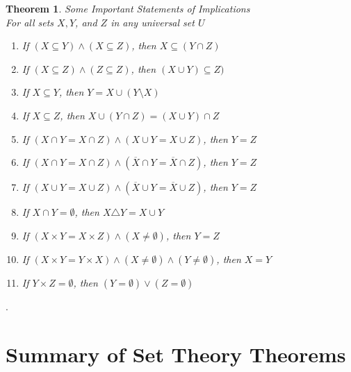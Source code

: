 \documentclass{book}
\newtheorem{theorem}{Theorem}[section]
\theoremstyle{definition}
\theoremstyle{remark}
\begin{document}
\newpage
\begin{theorem}
Some Important Statements of Implications \\

For all sets $X, Y$, and $Z$ in any universal set $U$ \\

    \begin{enumerate}
        \item If $(X \subseteq Y) \wedge (X \subseteq Z)$, then $X \subseteq (Y \cap Z)$
        \item If $(X \subseteq Z) \wedge (Z \subseteq Z)$, then $(X \cup Y) \subseteq Z)$
        \item If $X \subseteq Y$, then $Y = X \cup (Y \setminus X)$
        \item If $X \subseteq Z$, then $X \cup (Y \cap Z) = (X \cup Y) \cap Z$
        \item If $(X \cap Y = X \cap Z) \wedge (X \cup Y = X \cup Z)$, then $Y = Z$
        \item If $(X \cap Y = X \cap Z) \wedge (\overline{X} \cap Y = \overline{X} \cap Z)$, then $Y = Z$
        \item If $(X \cup Y = X \cup Z) \wedge (\overline{X} \cup Y = \overline{X} \cup Z)$, then $Y = Z$
        \item If $X \cap Y = \emptyset$, then $X \triangle Y = X \cup Y$
        \item If $(X \times Y = X \times Z) \wedge (X \neq \emptyset)$, then $Y = Z$
        \item If $(X \times Y = Y \times X) \wedge (X \neq \emptyset) \wedge (Y \neq \emptyset)$, then $X = Y$
        \item If $Y \times Z = \emptyset$, then $(Y = \emptyset) \vee (Z = \emptyset)$
    \end{enumerate}
\end{theorem}




\newpage.
\section{Summary of Set Theory Theorems}
\end{document}
